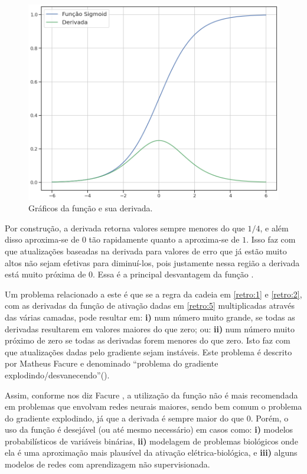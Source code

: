 \begin{figure}[htb]
\centering
\includegraphics[width=12cm]{figuras/der_sigm}
\caption{Gráficos da função  e sua derivada.}
\label{fig:der_sigm}
\end{figure}

Por construção, a derivada retorna valores sempre menores do que $1/4$, e além disso aproxima-se de $0$ tão rapidamente quanto a  aproxima-se de $1$. Isso faz com que atualizações baseadas na derivada para valores de erro que já estão muito altos não sejam efetivas para diminuí-los, pois justamente nessa região a derivada está muito próxima de $0$. Essa é a principal desvantagem da função .

Um problema relacionado a este é que se a regra da cadeia em \eqref{retro:1} e \eqref{retro:2}, com as derivadas da função de ativação dadas em \eqref{retro:5} multiplicadas através das várias camadas, pode resultar em: \textbf{i)} num número muito grande, se todas as derivadas resultarem em valores maiores do que zero; ou: \textbf{ii)} num número muito próximo de zero se todas as derivadas forem menores do que zero. Isto faz com que atualizações dadas pelo gradiente sejam instáveis. Este problema é descrito por Matheus Facure \citep{matheus_2} e denominado ``problema do gradiente explodindo/desvanecendo''().

Assim, conforme nos diz Facure \citep{matheus}, a utilização da função  não é mais recomendada em problemas que envolvam redes neurais maiores, sendo bem comum o problema do gradiente explodindo, já que a derivada é sempre maior do que $0$. Porém, o uso da função  é desejável (ou até mesmo necessário) em casos como: \textbf{i)} modelos probabilísticos de variáveis binárias, \textbf{ii)} modelagem de problemas biológicos onde ela é uma aproximação mais plausível da ativação elétrica-biológica, e \textbf{iii)} alguns modelos de redes com aprendizagem não supervisionada.

